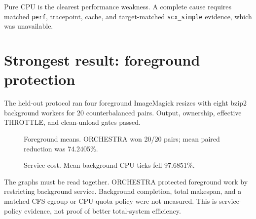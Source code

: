 \documentclass[11pt,a4paper,oneside]{report}
\begin{document}
Pure CPU is the clearest performance weakness. A complete cause requires
matched \texttt{perf}, tracepoint, cache, and target-matched
\texttt{scx\_simple} evidence, which was unavailable.

\section{Strongest result: foreground protection}

The held-out protocol ran four foreground ImageMagick resizes with eight bzip2
background workers for 20 counterbalanced pairs. Output, ownership, effective
THROTTLE, and clean-unload gates passed.

\begin{figure}[H]
\centering
{}
\caption{Foreground means. ORCHESTRA won 20/20 pairs; mean paired reduction was
74.2405\%.}
\label{fig:foreground}
\end{figure}

\begin{figure}[H]
\centering
{}
\caption{Service cost. Mean background CPU ticks fell 97.6851\%.}
\label{fig:cost}
\end{figure}

The graphs must be read together. ORCHESTRA protected foreground work by
restricting background service. Background completion, total makespan, and a
matched CFS cgroup or CPU-quota policy were not measured. This is service-policy
evidence, not proof of better total-system efficiency.
\end{document}
